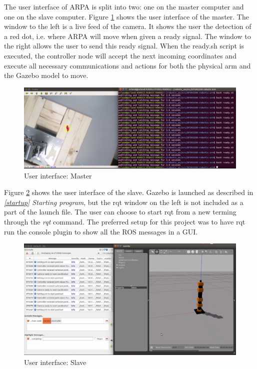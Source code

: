 \documentclass[11pt,a4paper, titlepage]{article}
\begin{document}
	The user interface of ARPA is split into two: one on the master computer and one on the slave computer. Figure \ref{fig:ui-master} shows the user interface of the master. The window to the left is a live feed of the camera. It shows the user the detection of a red dot, i.e. where ARPA will move when given a ready signal. The window to the right allows the user to send this ready signal. When the ready.sh script is executed, the controller node will accept the next incoming coordinates and execute all necessary communications and actions for both the physical arm and the Gazebo model to move.
	
	\begin{figure}[H]
		\centering
		\includegraphics[width=0.95\linewidth]{../Diagrams/UI-master.png}
		\caption{User interface: Master}
		\label{fig:ui-master}
	\end{figure}
	
	Figure \ref{fig:ui-slave} shows the user interface of the slave. Gazebo is launched as described in \textit{\ref{startup} Starting program}, but the rqt window on the left is not included as a part of the launch file. The user can choose to start rqt from a new terming through the \textit{rqt} command. The preferred setup for this project was to have rqt run the console plugin to show all the ROS messages in a GUI.
	
	\begin{figure}[H]
		\centering
		\includegraphics[width=0.95\linewidth]{../Diagrams/UI-slave.png}
		\caption{User interface: Slave}
		\label{fig:ui-slave}
	\end{figure}
	
\end{document}
